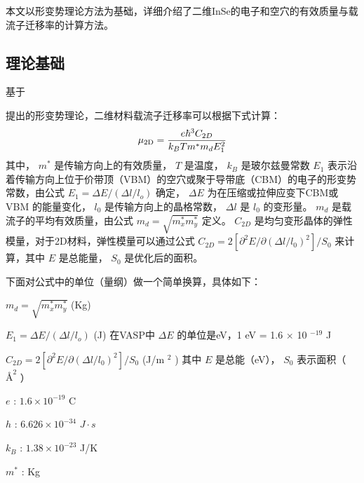 \documentclass[a4paper,12pt,english]{sphinxmanual}
\begin{document}
\sphinxAtStartPar
本文以形变势理论方法为基础，详细介绍了二维InSe的电子和空穴的有效质量与载流子迁移率的计算方法。


\subsection{理论基础}
\label{\detokenize{tutorials/vasp/mobility:id2}}
\sphinxAtStartPar
基于 %
\begin{footnote}[15]\sphinxAtStartFootnote
{}
%
\end{footnote} 提出的形变势理论，二维材料载流子迁移率可以根据下式计算：
\begin{equation*}
\begin{split}\mu_{\rm 2D} = \frac{e\hbar^3C_{2D}}{k_BTm^{\ast}m_dE_1^2}\end{split}
\end{equation*}
\sphinxAtStartPar
其中， \(m^{\ast}\) 是传输方向上的有效质量， \(T\) 是温度， \(k_B\) 是玻尔兹曼常数 \(E_1\) 表示沿着传输方向上位于价带顶（VBM）的空穴或聚于导带底（CBM）的电子的形变势常数，由公式 \(E_1 = {\Delta}E/({\Delta}l/l_o)\) 确定， \({\Delta}E\) 为在压缩或拉伸应变下CBM或VBM 的能量变化， \(l_0\) 是传输方向上的晶格常数， \({\Delta}l\) 是 \(l_0\) 的变形量。 \(m_d\) 是载流子的平均有效质量，由公式 \(m_d = \sqrt{m_x^{\ast}m_y^{\ast}}\) 定义。 \(C_{2D}\) 是均匀变形晶体的弹性模量，对于2D材料，弹性模量可以通过公式 \(C_{2D}=2[{\partial}^2E/{\partial}({\Delta}l/l_0)^2]/S_0\) 来计算，其中 \(E\) 是总能量， \(S_0\) 是优化后的面积。

\sphinxAtStartPar
下面对公式中的单位（量纲）做一个简单换算，具体如下：

\begin{DUlineblock}{0em}
\item[] \(m_d = \sqrt{m_x^{\ast}m_y^{\ast}}\) (Kg)
\item[] \(E_1 = {\Delta}E/({\Delta}l/l_o)\) (J) 在VASP中 \({\Delta}E\) 的单位是eV，1 eV = 1.6 \(\times\) 10 \(^{-19}\) J
\item[] \(C_{2D} = 2[{\partial}^2E/{\partial}({\Delta}l/l_0)^2]/S_0\) (J/m \(^2\) ) 其中 \(E\) 是总能（eV）， \(S_0\) 表示面积（ \(Å^2\) ）
\item[] \(e\) : \(1.6 \times 10^{-19}\) C
\item[] \(h\) : \(6.626 \times 10^{-34}\) \(J \cdot s\)
\item[] \(k_B\) : \(1.38 \times 10^{-23}\) J/K
\item[] \(m^{\ast}\) : Kg
\end{DUlineblock}
\end{document}
